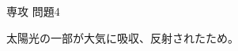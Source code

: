 \documentclass[fleqn]{jbook}
\begin{document}
\begin{answer}{専攻 問題4}{}
\begin{subanswers}
\begin{subsubanswers}
\SubSubAnswer
太陽光の一部が大気に吸収、反射されたため。
\end{subsubanswers}
\end{subanswers}
\end{answer}
\end{document}
